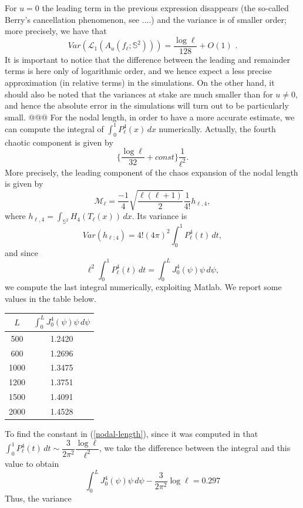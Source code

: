 \documentclass[aps,prd,showpacs,superscriptaddress,groupedaddress]{revtex4-1}  %
\begin{document}
For $u=0$ the leading term in the previous expression disappears (the so-called Berry's cancellation phenomenon, see ....) and the variance is of smaller order; more precisely, we have that
\begin{equation*}
Var \left( \mathcal{L}_{1}(A_{u}(f_{\ell };\mathbb{S}^{2})) \right) =\frac{\log \ell}{128}+O(1) \text{ .}
\end{equation*}
It is important to notice that the difference between the leading and remainder terms is here only of logarithmic order, and we hence expect a less precise approximation (in relative terms) in the simulations. On the other hand, it should also be noted that the variances at stake are much smaller than for $u \neq 0$, and hence the absolute error in the simulations will turn out to be particularly small.
@@@
For the nodal length, in order to have a more accurate estimate, we can compute the integral of $\int_{0}^{1} P_\ell^4(x) \,dx$ numerically. Actually, the fourth chaotic component is given by 
\begin{equation}\label{nodal-length}
\bigg\{\dfrac{\log \ell}{32}+const\bigg\} \dfrac{1}{\ell^2}.
\end{equation}
More precisely, the leading component of the chaos expansion of the nodal length is given by
$$\mathcal{M}_\ell=\dfrac{-1}{4} \sqrt{\dfrac{\ell(\ell+1)}{2}} \dfrac{1}{4!} h_{\ell,4},$$
where $h_{\ell,4}=\int_{\mathbb{S}^2}H_4(T_\ell(x))\,dx$. Its variance is
$$Var(h_{\ell;4})=4! (4\pi)^2 \int_{0}^{1} P_\ell^4(t) \,dt,$$ and since 
$$\ell^2 \int_{0}^{1} P_\ell^4(t)\, dt= \int_{0}^{L} J_0^4(\psi) \psi \,d\psi,$$ we compute the last integral numerically, exploiting Matlab. We report some values in the table below.
\begin{center}
\begin{tabular}{|c|c|}
	\hline
	$L$ &\textbf{	$\int_{0}^{L} J_0^4(\psi)\psi\,d\psi$ } \\
	\hline 500 & 1.2420\\
	\hline 600&  1.2696\\
	\hline  1000 &  1.3475 \\
	\hline 1200 & 1.3751\\
	\hline 1500 & 1.4091 \\
	\hline 2000 & 1.4528 \\
	\hline
\end{tabular}
\end{center}
To find the constant in (\ref{nodal-length}), since it was computed in \cite{} that $\int_{0}^{1} P_\ell^4(t) \,dt \sim \dfrac{3}{2\pi^2} \dfrac{\log \ell}{\ell^2}$, we take the difference between the integral and this value to obtain
$$\int_{0}^{L} J_0^4(\psi) \psi \, d\psi -\dfrac{3}{2\pi^2} \log \ell=0.297$$
Thus, the variance 
\end{document}
